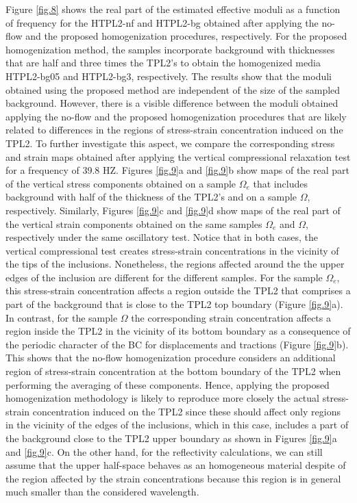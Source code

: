 \documentclass[draft]{agujournal2019}
\begin{document}
Figure \ref{fig.8} shows the real part of the estimated effective moduli as a function of frequency for the HTPL2-nf and HTPL2-bg obtained after applying the  no-flow  and  the proposed homogenization procedures, respectively. For the proposed homogenization method, the samples incorporate background with thicknesses that are half and three times the TPL2's to obtain the homogenized media HTPL2-bg05 and HTPL2-bg3, respectively. The results show that the moduli obtained using the proposed method are independent of the size of the sampled background. However, there is a visible difference between the moduli obtained applying the no-flow and the proposed homogenization procedures that are likely  related to differences in the regions of stress-strain concentration induced on the TPL2. To further investigate this aspect, we compare the corresponding  stress and strain maps obtained after applying the vertical compressional relaxation test for a frequency of 39.8 HZ. Figures \ref{fig.9}a and \ref{fig.9}b show maps of the real part of the vertical stress components obtained on a sample $\Omega_e$ that includes background with half of the thickness of the TPL2's and on a sample $\Omega$, respectively. Similarly, Figures
 \ref{fig.9}c and \ref{fig.9}d show maps of the real part of the vertical strain components obtained on the same samples  $\Omega_e$ and $\Omega$, respectively under the same oscillatory test. Notice that in both cases, the vertical compressional test creates stress-strain concentrations in the vicinity of the tips of the inclusions. Nonetheless, the regions affected around the the upper edges of the inclusion are different for the different samples. For the sample $\Omega_e$, this stress-strain concentration affects a region outside the TPL2 that comprises a part of the background that is close to the TPL2 top boundary (Figure \ref{fig.9}a). In contrast, for the sample $\Omega$  the corresponding strain concentration affects a region inside the TPL2 in the vicinity of its bottom boundary as a consequence of the periodic character of the BC for displacements and tractions (Figure \ref{fig.9}b). This shows that the no-flow homogenization procedure considers an additional region of stress-strain concentration at the bottom boundary of the TPL2 when performing the averaging of these components. Hence, applying the proposed homogenization methodology is likely to reproduce more closely the actual stress-strain concentration induced on the TPL2 since these should affect only regions in the vicinity of the edges of the inclusions, which in this case, includes a part of the background close to the TPL2 upper boundary as shown in Figures \ref{fig.9}a and \ref{fig.9}c. On the other hand, for the reflectivity calculations, we can still assume that the upper half-space behaves as an homogeneous material despite of the region affected by the strain concentrations because this region is in general much smaller than the considered wavelength.
\end{document}
